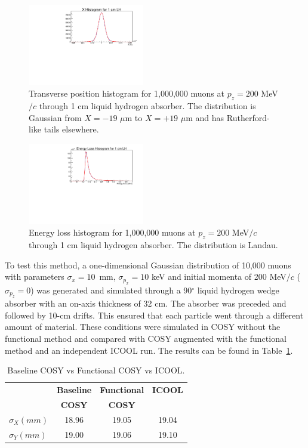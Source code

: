 \documentclass{jacow}
\begin{document}
\begin{figure}[htf]
\centering
\includegraphics[width=0.45\textwidth]{scattering_curve.pdf}
\caption{Transverse position histogram for 1,000,000 muons at $p_z = 200$ MeV$/c$ through 1 cm liquid hydrogen absorber. The distribution is Gaussian from $X=-19$ $\mu$m to $X =+19$ $\mu$m and has Rutherford-like tails elsewhere.}
\label{fig:scattering_curve}
\end{figure}

\begin{figure}[htf]
\centering
\includegraphics[width=0.45\textwidth]{straggling_curve.pdf}
\caption{Energy loss histogram for 1,000,000 muons at $p_z = 200$ MeV$/c$ through 1 cm liquid hydrogen absorber. The distribution is Landau.}
\label{fig:straggling_curve}
\end{figure}

To test this method, a one-dimensional Gaussian distribution of 10,000 muons with parameters $\sigma_x=10$~mm, $\sigma_{p_x}=10$ keV and initial momenta of 200 MeV$/c$ ($\sigma_{p_z} = 0$) was generated and simulated through a 90$^\circ$ liquid hydrogen wedge absorber with an on-axis thickness of 32 cm. The absorber was preceded and followed by 10-cm drifts. This ensured that each particle went through a different amount of material. These conditions were simulated in COSY without the functional method and compared with COSY augmented with the functional method and an independent ICOOL run. The results can be found in Table~\ref{tab:comparison}.

\begin{table}[hbt]
   \centering
   \caption{Baseline COSY vs Functional COSY vs ICOOL.}
   \begin{tabular}{lccc}
       \toprule
	\textbf{}& \textbf{Baseline} & \textbf{Functional}& \textbf{ICOOL} \\ 
	\textbf{}& \textbf{COSY} & \textbf{COSY}& \textbf{} \\ 
          $ \sigma_X (mm)$&18.96&19.05&19.04\\
	$\sigma_Y (mm)$&19.00&19.06&19.10\\
	\bottomrule
   \end{tabular}
   \label{tab:comparison}
\end{table}
\end{document}
